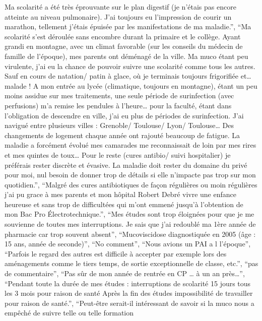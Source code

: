 \documentclass[
  letterpaper,
  DIV=11,
  numbers=noendperiod]{scrartcl}
\begin{document}
\begin{itemize}
  Ma scolarité a été très éprouvante sur le plan digestif (je n'étais
  pas encore atteinte au niveau pulmonaire). J'ai toujours eu
  l'impression de courir un marathon, tellement j'étais épuisée par les
  manifestations de ma maladie.'', ``Ma scolarité s'est déroulée sans
  encombre durant la primaire et le collège. Ayant grandi en montagne,
  avec un climat favorable (sur les conseils du médecin de famille de
  l'époque), mes parents ont déménagé de la ville. Ma muco étant peu
  virulente, j'ai eu la chance de pouvoir suivre une scolarité comme
  tous les autres. Sauf en cours de natation/ patin à glace, où je
  terminais toujours frigorifiée et\ldots{} malade ! A mon entrée au
  lycée (climatique, toujours en montagne), étant un peu moins assidue
  sur mes traitements, une seule période de surinfection (avec
  perfusions) m'a remise les pendules à l'heure\ldots{} pour la faculté,
  étant dans l'obligation de descendre en ville, j'ai eu plus de
  périodes de surinfection. J'ai navigué entre plusieurs villes :
  Grenoble/ Toulouse/ Lyon/ Toulouse\ldots{} Des changements de logement
  chaque année ont rajouté beaucoup de fatigue. La maladie a forcément
  évolué mes camarades me reconnaissait de loin par mes rires et mes
  quintes de toux\ldots{} Pour le reste (cures antibio/ suivi
  hospitalier) je préférais rester discrète et évasive. La maladie doit
  rester du domaine du privé pour moi, nul besoin de donner trop de
  détails si elle n'impacte pas trop sur mon quotidien.'', ``Malgré des
  cures antibiotiques de façon régulières ou moin régulières j'ai pu
  grace à mes parents et mon hôpital Robert Debré vivre une enfance
  heureuse et sans trop de difficultées qui m'ont emmené jusqu'à
  l'obtention de mon Bac Pro Électrotechnique.'', ``Mes études sont trop
  éloignées pour que je me souvienne de toutes mes interruptions. Je
  sais que j'ai redoublé ma 1ère année de pharmacie car trop souvent
  absent'', ``Mucoviscidose diagnostiquée en 2005 (âge : 15 ans, année
  de seconde)'', ``No comment'', ``Nous avions un PAI a l l'époque'',
  ``Parfois le regard des autres est difficile à accepter par exemple
  lors des aménagements comme le tiers temps, de sortie exceptionnelle
  de classe, etc.'', ``pas de commentaire'', ``Pas sûr de mon année de
  rentrée en CP \ldots{} à un an près\ldots{}'', ``Pendant toute la
  durée de mes études : interruptions de scolarité 15 jours tous les 3
  mois pour raison de santé Après la fin des études impossibilité de
  travailler pour raison de santé.'', ``Peut-être serait-il intéressant
  de savoir si la muco nous a empêché de suivre telle ou telle formation

\end{itemize}
\end{document}
